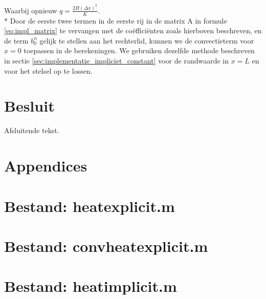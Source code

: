\documentclass[a4paper,kulak]{kulakarticle} %
\newcommand{\inputcode}[1]{
	
}
\begin{document}
Waarbij opnieuw $q = \frac{2 H (\Delta x)^2}{K}$.\\*
Door de eerste twee termen in de eerste rij in de matrix A in formule \ref{eq:impl_matrix} te vervangen met de coëfficiënten zoals hierboven beschreven, en de term $b_0^n$ gelijk te stellen aan het rechterlid, kunnen we de convectieterm voor $x=0$ toepassen in de berekeningen. We gebruiken dezelfde methode beschreven in sectie \ref{sec:implementatie_impliciet_constant} voor de randwaarde in $x = L$ en voor het stelsel op te lossen.

\section*{Besluit}

Afsluitende tekst.

\section*{Appendices}

\appendix

\section{Bestand: heat\textunderscore explicit.m}
	\label{code:heat_explicit}
	\inputcode{heat_explicit}

\newpage
\section{Bestand: convheat\textunderscore explicit.m}
	\label{code:convheat_explicit}
	\inputcode{convheat_explicit}
	
\newpage
\section{Bestand: heat\textunderscore implicit.m}
	\label{code:heat_implicit}
	\inputcode{heat_implicit}
	
	
\end{document}
